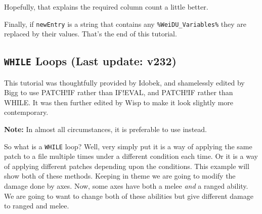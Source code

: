 \documentclass{article}
\def\ttref#1{\ahrefloc{#1}{\tt #1}}
\def\DEFINE#1{{\tt \bf #1}\label{#1}\index{#1}}
\def\t#1{{\tt #1}}
\begin{document}
Hopefully, that explains the required column count a little better.

%
%
%
%

Finally, if \t{newEntry} is a string that contains any
\t{\%WeiDU\_Variables\%} they are replaced by their values.
That's the end of this tutorial.

\subsection{\DEFINE{WHILE} Loops (Last update: v232)}

This tutorial was thoughtfully provided by Idobek, and shamelessly edited
by Bigg to use PATCH!IF rather than IF!EVAL, and PATCH!IF rather than WHILE.
It was then further edited by Wisp to make it look slightly more contemporary.

\textbf{Note:} In almost all circumstances, it is preferable to use \ttref{FOR}
instead.

So what is a \t{WHILE} loop? Well, very simply put it is a way of
applying the same patch to a file multiple times under a different
condition each time. Or it is a way of applying different patches depending
upon the conditions. This example will show both of these methods. Keeping
in theme we are going to modify the damage done by axes. Now, some axes
have both a melee \emph{and} a ranged ability. We are going to want to
change both of these abilities but give different damage to ranged and
melee.
\end{document}
